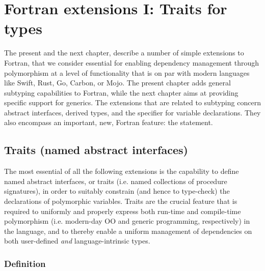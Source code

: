 \documentclass[11pt,oneside]{report}
\newcommand{\code}[1]{{\selectfont\ttfamily{#1}}}
\begin{document}
\chapter{Fortran extensions I: Traits for types}
\label{chapt:traits}

The present and the next chapter, describe a number of simple
extensions to Fortran, that we consider essential for enabling
dependency management through polymorphism at a level of functionality
that is on par with modern languages like Swift, Rust, Go, Carbon, or
Mojo. The present chapter adds general subtyping capabilities to
Fortran, while the next chapter aims at providing specific support for
generics. The extensions that are related to subtyping concern
abstract interfaces, derived types, and the \code{class} specifier for
variable declarations. They also encompass an important, new, Fortran
feature: the \code{implements} statement.

\section{Traits (named abstract interfaces) }
\label{sect:traits}

The most essential of all the following extensions is the capability
to define named abstract interfaces, or traits (i.e. named collections
of procedure signatures), in order to suitably constrain (and hence to
type-check) the declarations of polymorphic variables. Traits are the
crucial feature that is required to uniformly and properly
express both run-time and compile-time polymorphism (i.e. modern-day
OO and generic programming, respectively) in the language, and to
thereby enable a uniform management of dependencies on both
user-defined \emph{and} language-intrinsic types.

\subsection{Definition}
\label{sect:interface_defs}
\end{document}
